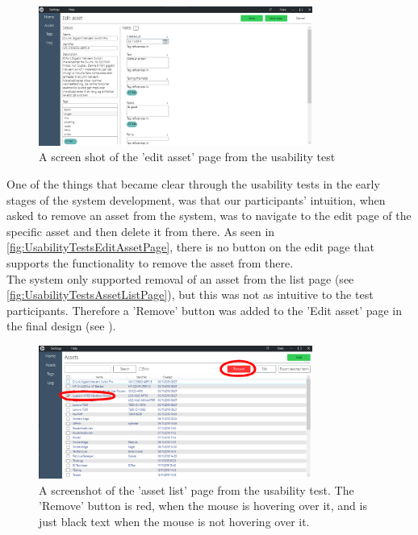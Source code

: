 \begin{figure}[H]
    \centering
    \includegraphics[width=0.8\textwidth]{figures/PicturesOfTheSystem/Usabilitytest_editAsset.png}
    \caption{A screen shot of the 'edit asset' page from the usability test}
    \label{fig:UsabilityTestsEditAssetPage}
\end{figure}

One of the things that became clear through the usability tests in the early stages of the system development, was that our participants' intuition, when asked to remove an asset from the system, was to navigate to the edit page of the specific asset and then delete it from there. As seen in \autoref{fig:UsabilityTestsEditAssetPage}, there is no button on the edit page that supports the functionality to remove the asset from there.\\
The system only supported removal of an asset from the list page (see \autoref{fig:UsabilityTestsAssetListPage}), but this was not as intuitive to the test participants. Therefore a 'Remove' button was added to the 'Edit asset' page in the final design (see ).

\begin{figure}[H]
    \centering
    \includegraphics[width=0.8\textwidth]{figures/PicturesOfTheSystem/Usabilitytest_AssetList.png}
    \caption{A screenshot of the 'asset list' page from the usability test. The 'Remove' button is red, when the mouse is hovering over it, and is just black text when the mouse is not hovering over it.}
    \label{fig:UsabilityTestsAssetListPage}
\end{figure}

